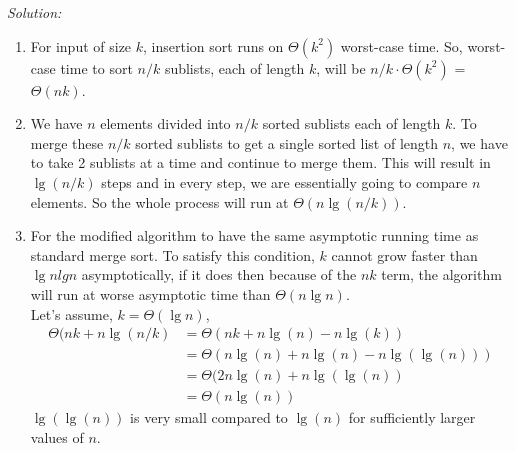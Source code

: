 \documentclass{article}
\newenvironment{solution}
    {\textit{Solution:}}
    {}
\begin{document}
\begin{solution}	
	\begin{enumerate}
		\item For input of size $k$, insertion sort runs on $\Theta(k^2)$ worst-case time. So, worst-case time to sort $n/k$ sublists, each of length $k$, will be $n/k \cdot \Theta(k^2)$ = $\Theta(nk)$.
		\item We have $n$ elements divided into $n/k$ sorted sublists each of length $k$. To merge these $n/k$ sorted sublists to get a single sorted list of length $n$, we have to take 2 sublists at a time and continue to merge them. This will result in $\lg (n/k)$ steps and in every step, we are essentially going to compare $n$ elements. So the whole process will run at $\Theta(n \lg (n/k))$.
		\item For the modified algorithm to have the same asymptotic running time as standard merge sort. To satisfy this condition, $k$ cannot grow faster than $\lg nlgn$ asymptotically, if it does then because of the $nk$ term, the algorithm will run at worse asymptotic time than $\Theta(n \lg n)$.\\
		Let’s assume, $k = \Theta(\lg n)$,
	\begin{equation}
		\begin{aligned}
			\Theta(nk + n\lg(n/k) & = \Theta(nk + n\lg(n) - n\lg(k))\\
				& = \Theta(n\lg(n) + n\lg(n) - n\lg(\lg(n)))\\
				& = \Theta(2n\lg(n) + n\lg(\lg(n))\\
				& = \Theta(n\lg(n))
	  	\end{aligned}
	\end{equation}
	$\lg(\lg(n))$ is very small compared to $\lg(n)$ for sufficiently larger values of $n$.
	\end{enumerate}
\end{solution}
\end{document}
